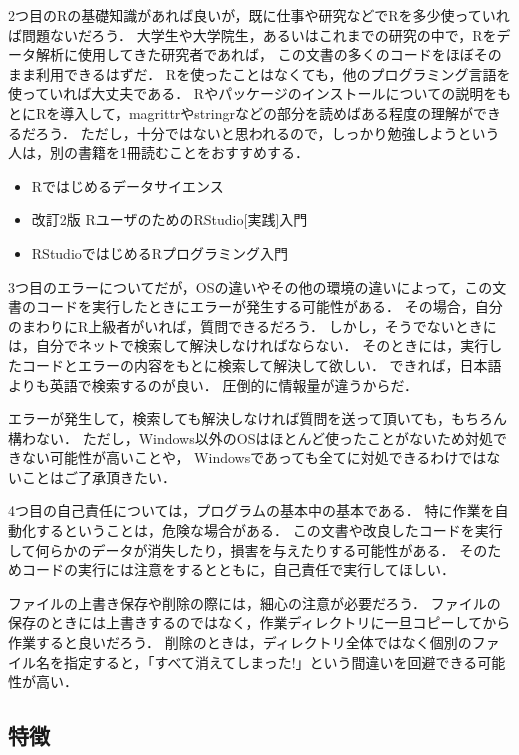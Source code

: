 \documentclass[
]{article}
\providecommand{\tightlist}{%
  \setlength{\itemsep}{0pt}\setlength{\parskip}{0pt}}
\begin{document}
2つ目のRの基礎知識があれば良いが，既に仕事や研究などでRを多少使っていれば問題ないだろう．
大学生や大学院生，あるいはこれまでの研究の中で，Rをデータ解析に使用してきた研究者であれば，
この文書の多くのコードをほぼそのまま利用できるはずだ．
Rを使ったことはなくても，他のプログラミング言語を使っていれば大丈夫である．
Rやパッケージのインストールについての説明をもとにRを導入して，magrittrやstringrなどの部分を読めばある程度の理解ができるだろう．
ただし，十分ではないと思われるので，しっかり勉強しようという人は，別の書籍を1冊読むことをおすすめする．

\begin{itemize}
\tightlist
\item
  Rではじめるデータサイエンス\\
\item
  改訂2版 RユーザのためのRStudio{[}実践{]}入門\\
\item
  RStudioではじめるRプログラミング入門
\end{itemize}

3つ目のエラーについてだが，OSの違いやその他の環境の違いによって，この文書のコードを実行したときにエラーが発生する可能性がある．
その場合，自分のまわりにR上級者がいれば，質問できるだろう．
しかし，そうでないときには，自分でネットで検索して解決しなければならない．
そのときには，実行したコードとエラーの内容をもとに検索して解決して欲しい．
できれば，日本語よりも英語で検索するのが良い．
圧倒的に情報量が違うからだ．

エラーが発生して，検索しても解決しなければ質問を送って頂いても，もちろん構わない．
ただし，Windows以外のOSはほとんど使ったことがないため対処できない可能性が高いことや，
Windowsであっても全てに対処できるわけではないことはご了承頂きたい．

4つ目の自己責任については，プログラムの基本中の基本である．
特に作業を自動化するということは，危険な場合がある．
この文書や改良したコードを実行して何らかのデータが消失したり，損害を与えたりする可能性がある．
そのためコードの実行には注意をするとともに，自己責任で実行してほしい．

ファイルの上書き保存や削除の際には，細心の注意が必要だろう．
ファイルの保存のときには上書きするのではなく，作業ディレクトリに一旦コピーしてから作業すると良いだろう．
削除のときは，ディレクトリ全体ではなく個別のファイル名を指定すると，「すべて消えてしまった!」という間違いを回避できる可能性が高い．

\hypertarget{ux7279ux5fb4}{%
\subsection{特徴}\label{ux7279ux5fb4}}
\end{document}
